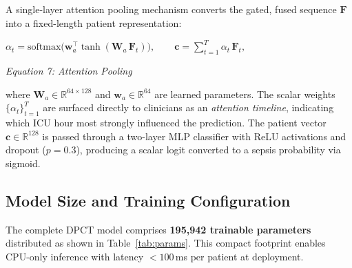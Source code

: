\documentclass[conference,12pt]{IEEEtran}
\newcommand{\dpct}{\textsc{DPCT}}
\newcommand{\tab}[1]{Table~\ref{#1}}
\begin{document}
A single-layer attention pooling mechanism converts the gated, fused sequence
$\mathbf{F}$ into a fixed-length patient representation:
%
\vspace{1em}
\begin{center}
  $\displaystyle
  \boxed{
  \alpha_t
    = \mathrm{softmax}\!\bigl(\mathbf{w}_a^{\top}
        \tanh(\mathbf{W}_a\,\mathbf{F}_t)\bigr),
  \qquad
  \mathbf{c}
    = \sum_{t=1}^{T}\alpha_t\,\mathbf{F}_t,
  }
  $
  \vspace{0.5em}
  
  \textit{Equation 7: Attention Pooling}
\end{center}
\vspace{1em}
%
where $\mathbf{W}_a \in \mathbb{R}^{64 \times 128}$ and
$\mathbf{w}_a \in \mathbb{R}^{64}$ are learned parameters.
The scalar weights $\{\alpha_t\}_{t=1}^{T}$ are surfaced directly to clinicians
as an \emph{attention timeline}, indicating which ICU hour most strongly
influenced the prediction.
The patient vector $\mathbf{c} \in \mathbb{R}^{128}$ is passed through a
two-layer MLP classifier with ReLU activations and dropout ($p = 0.3$),
producing a scalar logit converted to a sepsis probability via sigmoid.

\subsection{\textbf{Model Size and Training Configuration}}
\label{sec:training}

The complete \dpct{} model comprises \textbf{195,942 trainable parameters}
distributed as shown in \tab{tab:params}.
This compact footprint enables CPU-only inference with latency
$<100$\,ms per patient at deployment.
\end{document}
